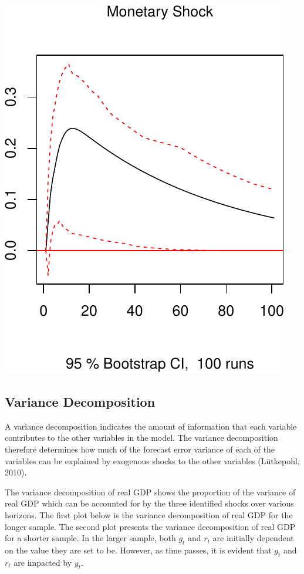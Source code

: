 \documentclass[11pt,preprint, authoryear]{elsarticle}
\numberwithin{equation}{section}
\numberwithin{figure}{section}
\numberwithin{table}{section}
\begin{document}
\includegraphics{TS_proj_files/figure-latex/unnamed-chunk-20-3.pdf}

\newpage

\hypertarget{variance-decomposition}{%
\subsection{Variance Decomposition}\label{variance-decomposition}}

A variance decomposition indicates the amount of information that each
variable contributes to the other variables in the model. The variance
decomposition therefore determines how much of the forecast error
variance of each of the variables can be explained by exogenous shocks
to the other variables (Lütkepohl, 2010).

The variance decomposition of real GDP shows the proportion of the
variance of real GDP which can be accounted for by the three identified
shocks over various horizons. The first plot below is the variance
decomposition of real GDP for the longer sample. The second plot
presents the variance decomposition of real GDP for a shorter sample. In
the larger sample, both \(g_t\) and \(r_t\) are initially dependent on
the value they are set to be. However, as time passes, it is evident
that \(g_t\) and \(r_t\) are impacted by \(y_t\).
\end{document}
